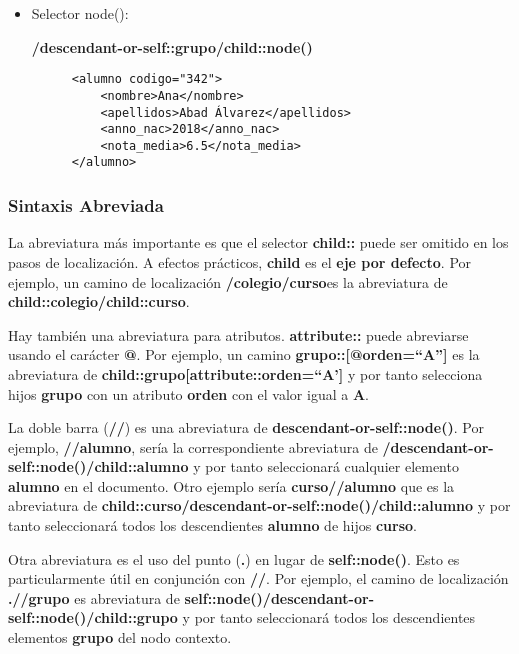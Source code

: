 \begin{itemize}
    \item Selector node():

    \textbf{/descendant-or-self::grupo/child::node()}
    \begin{figure}[H]
    \begin{tcolorbox}[sharp corners, colback=yellow!30, colframe=white!20]
        \scriptsize
        \begin{verbatim}
<alumno codigo="342">
    <nombre>Ana</nombre>
    <apellidos>Abad Álvarez</apellidos>
    <anno_nac>2018</anno_nac>
    <nota_media>6.5</nota_media>
</alumno>
        \end{verbatim}
    \end{tcolorbox}
\end{figure}
\end{itemize}

\subsubsection{Sintaxis Abreviada}
La abreviatura más importante es que el selector \textbf{child::} puede ser omitido en los pasos de localización. A efectos prácticos, \textbf{child} es el \textbf{eje por defecto}. Por ejemplo, un camino de localización \textbf{/colegio/curso}es la abreviatura de \textbf{child::colegio/child::curso}.

Hay también una abreviatura para atributos. \textbf{attribute::} puede abreviarse usando el carácter \textbf{@}. Por ejemplo, un camino \textbf{grupo::[@orden=``A'']} es la abreviatura de \textbf{child::grupo[attribute::orden=``A']} y por tanto selecciona hijos \textbf{grupo} con un atributo \textbf{orden} con el valor igual a \textbf{A}.

La doble barra (\textbf{//}) es una abreviatura de \textbf{descendant-or-self::node()}. Por ejemplo, \textbf{//alumno}, sería la correspondiente abreviatura de \textbf{/descendant-or-self::node()/child::alumno} y por tanto seleccionará cualquier elemento \textbf{alumno} en el documento. Otro ejemplo sería \textbf{curso//alumno} que es la abreviatura de \textbf{child::curso/descendant-or-self::node()/child::alumno} y por tanto seleccionará todos los descendientes \textbf{alumno} de hijos \textbf{curso}.

Otra abreviatura es el uso del punto (\textbf{.}) en lugar de \textbf{self::node()}. Esto es particularmente útil en conjunción con \textbf{//}. Por ejemplo, el camino de localización \textbf{.//grupo} es abreviatura de \textbf{self::node()/descendant-or-self::node()/child::grupo} y por tanto seleccionará todos los descendientes elementos \textbf{grupo} del nodo contexto.

